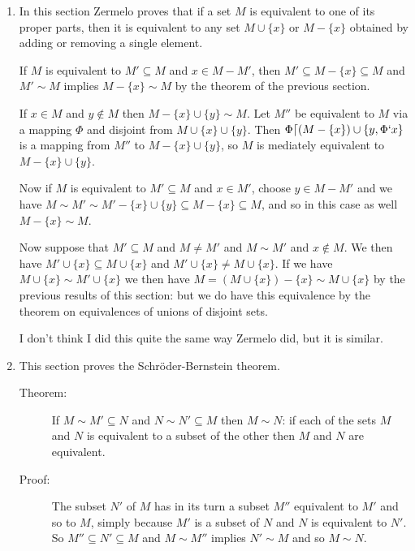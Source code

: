 \documentclass[12pt]{article}
\begin{document}
\begin{enumerate}
\begin{description}
\end{description}

\item  In this section Zermelo proves that if a set $M$ is equivalent to one of its proper parts, then it is equivalent to any set $M \cup \{x\}$ or $M - \{x\}$ obtained by adding
or removing a single element.

If $M$ is equivalent to $M' \subseteq M$ and $x \in M - M'$, then $M' \subseteq M - \{x\} \subseteq M$ and $M' \sim M$ implies $M - \{x\} \sim M$ by the theorem of the previous section.

If $x\in M$ and $y \not\in M$ then $M -\{x\} \cup \{y\} \sim M$.  Let $M''$ be equivalent to $M$ via a mapping $\Phi$ and disjoint from $M \cup \{x\} \cup \{y\}$.
Then $\Phi \lceil (M - \{x\}) \cup \{y,\Phi`x\}$ is a mapping from $M''$ to $M -\{x\}\cup \{y\}$, so $M$ is mediately equivalent to $M -\{x\} \cup \{y\}$.

Now if $M$ is equivalent to $M' \subseteq M$ and $x \in M'$, choose $y \in M-M'$ and we have $M \sim M' \sim M'-\{x\}\cup \{y\} \subseteq M-\{x\} \subseteq M$, and so
in this case as well $M-\{x\} \sim M$.

Now suppose that $M' \subseteq M$ and $M \neq M'$ and $M \sim M'$ and $x \not\in M$.  We then have $M' \cup \{x\} \subseteq M \cup \{x\}$ and $M' \cup \{x\} \neq M \cup \{x\}$.
If we have $M \cup \{x\} \sim M'\cup \{x\}$ we then have $M = (M \cup \{x\}) - \{x\} \sim M \cup \{x\}$ by the previous results of this section:  but we do have this equivalence
by the theorem on equivalences of unions of disjoint sets.

I don't think I did this quite the same way Zermelo did, but it is similar.

\item This section proves the Schr\"oder-Bernstein theorem.

\begin{description}

\item[Theorem:]  If $M \sim M' \subseteq N$ and $N \sim N'\subseteq M$ then $M \sim N$:  if each of the sets $M$ and $N$ is equivalent to a subset of the other then
$M$ and $N$ are equivalent.

\item[Proof:]  The subset $N'$ of $M$ has in its turn a subset $M''$ equivalent to $M'$ and so to $M$, simply because $M'$ is a subset of $N$ and $N$ is equivalent to $N'$.
So $M'' \subseteq N' \subseteq M$ and $M \sim M''$ implies $N' \sim M$ and so $M \sim N$.




\end{description}
\end{enumerate}
\end{document}
